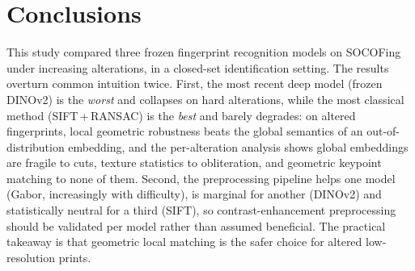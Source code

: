 \documentclass[11pt,a4paper]{article}
\begin{document}
\section{Conclusions}
This study compared three frozen fingerprint recognition models on SOCOFing under
increasing alterations, in a closed-set identification setting. The results
overturn common intuition twice. First, the most recent deep model (frozen
DINOv2) is the \emph{worst} and collapses on hard alterations, while the most
classical method (SIFT\,+\,RANSAC) is the \emph{best} and barely degrades: on
altered fingerprints, local geometric robustness beats the global semantics of an
out-of-distribution embedding, and the per-alteration analysis shows global
embeddings are fragile to cuts, texture statistics to obliteration, and geometric
keypoint matching to none of them. Second, the preprocessing pipeline helps one
model (Gabor, increasingly with difficulty), is marginal for another (DINOv2) and
statistically neutral for a third (SIFT), so contrast-enhancement preprocessing
should be validated per model rather than assumed beneficial. The practical
takeaway is that geometric local matching is the safer choice for altered
low-resolution prints.
\end{document}
